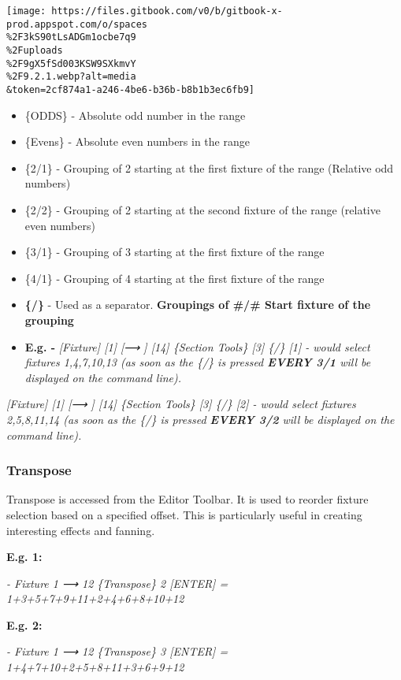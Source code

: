 \documentclass[
]{article}
\begin{document}
\texttt{[image: https://files.gitbook.com/v0/b/gitbook-x-prod.appspot.com/o/spaces\\\%2F3kS90tLsADGm1ocbe7q9\\\%2Fuploads\\\%2F9gX5fSd003KSW9SXkmvY\\\%2F9.2.1.webp?alt=media\\\&token=2cf874a1-a246-4be6-b36b-b8b1b3ec6fb9]}

\begin{itemize}
\item
  \{ODDS\} - Absolute odd number in the range
\item
  \{Evens\} - Absolute even numbers in the range
\item
  \{2/1\} - Grouping of 2 starting at the first fixture of the range (Relative odd numbers)
\item
  \{2/2\} - Grouping of 2 starting at the second fixture of the range (relative even numbers)
\item
  \{3/1\} - Grouping of 3 starting at the first fixture of the range
\item
  \{4/1\} - Grouping of 4 starting at the first fixture of the range
\item
  \textbf{\{/\}} - Used as a separator. \textbf{Groupings of \#/\# Start fixture of the grouping}
\item
  \textbf{E.g. -} \emph{{[}Fixture{]} {[}1{]} {[}⟶ {]} {[}14{]} \{Section Tools\} {[}3{]} \{/\} {[}1{]} - would select fixtures 1,4,7,10,13 (as soon as the \{/\} is pressed \textbf{EVERY 3/1} will be displayed on the command line).}
\end{itemize}

\emph{{[}Fixture{]} {[}1{]} {[}⟶ {]} {[}14{]} \{Section Tools\} {[}3{]} \{/\} {[}2{]} - would select fixtures 2,5,8,11,14 (as soon as the \{/\} is pressed \textbf{EVERY 3/2} will be displayed on the command line).}

\hypertarget{transpose}{%
\subsubsection{Transpose}\label{transpose}}

Transpose is accessed from the Editor Toolbar. It is used to reorder fixture selection based on a specified offset. This is particularly useful in creating interesting effects and fanning.

\textbf{E.g. 1:}

\emph{- Fixture 1 ⟶ 12 \{Transpose\} 2 {[}ENTER{]} = 1+3+5+7+9+11+2+4+6+8+10+12}

\textbf{E.g. 2:}

\emph{- Fixture 1 ⟶ 12 \{Transpose\} 3 {[}ENTER{]} = 1+4+7+10+2+5+8+11+3+6+9+12}
\end{document}
